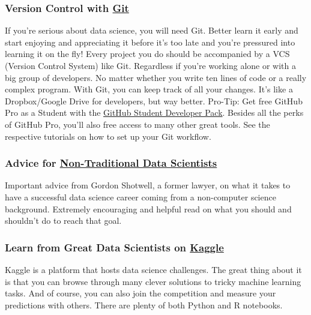 \documentclass[
  11pt,
]{article}
\begin{document}
\hypertarget{version-control-with-git}{%
\subsubsection*{\texorpdfstring{Version Control with \href{https://github.com/}{Git}}{Version Control with Git}}\label{version-control-with-git}}

If you're serious about data science, you will need Git. Better learn it early and start enjoying and appreciating it before it's too late and you're pressured into learning it on the fly! Every project you do should be accompanied by a VCS (Version Control System) like Git. Regardless if you're working alone or with a big group of developers. No matter whether you write ten lines of code or a really complex program. With Git, you can keep track of all your changes. It's like a Dropbox/Google Drive for developers, but way better. Pro-Tip: Get free GitHub Pro as a Student with the \href{https://education.github.com/pack}{GitHub Student Developer Pack}. Besides all the perks of GitHub Pro, you'll also free access to many other great tools. See the respective tutorials on how to set up your Git workflow.

\hypertarget{advice-for-non-traditional-data-scientists}{%
\subsubsection*{\texorpdfstring{Advice for \href{https://blog.shotwell.ca/posts/learning_data_science/}{Non-Traditional Data Scientists}}{Advice for Non-Traditional Data Scientists}}\label{advice-for-non-traditional-data-scientists}}

Important advice from Gordon Shotwell, a former lawyer, on what it takes to have a successful data science career coming from a non-computer science background. Extremely encouraging and helpful read on what you should and shouldn't do to reach that goal.

\hypertarget{learn-from-great-data-scientists-on-kaggle}{%
\subsubsection*{\texorpdfstring{Learn from Great Data Scientists on \href{https://www.kaggle.com/}{Kaggle}}{Learn from Great Data Scientists on Kaggle}}\label{learn-from-great-data-scientists-on-kaggle}}

Kaggle is a platform that hosts data science challenges. The great thing about it is that you can browse through many clever solutions to tricky machine learning tasks. And of course, you can also join the competition and measure your predictions with others. There are plenty of both Python and R notebooks.
\end{document}
